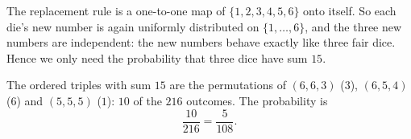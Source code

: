 The replacement rule is a one-to-one map of $\{1,2,3,4,5,6\}$ onto itself. So each die's new number is again uniformly distributed on $\{1,\dots,6\}$, and the three new numbers are independent: the new numbers behave exactly like three fair dice. Hence we only need the probability that three dice have sum $15$.

The ordered triples with sum $15$ are the permutations of $(6,6,3)$ ($3$), $(6,5,4)$ ($6$) and $(5,5,5)$ ($1$): $10$ of the $216$ outcomes. The probability is
\[\dfrac{10}{216}=\boxed{\dfrac{5}{108}}.\]

